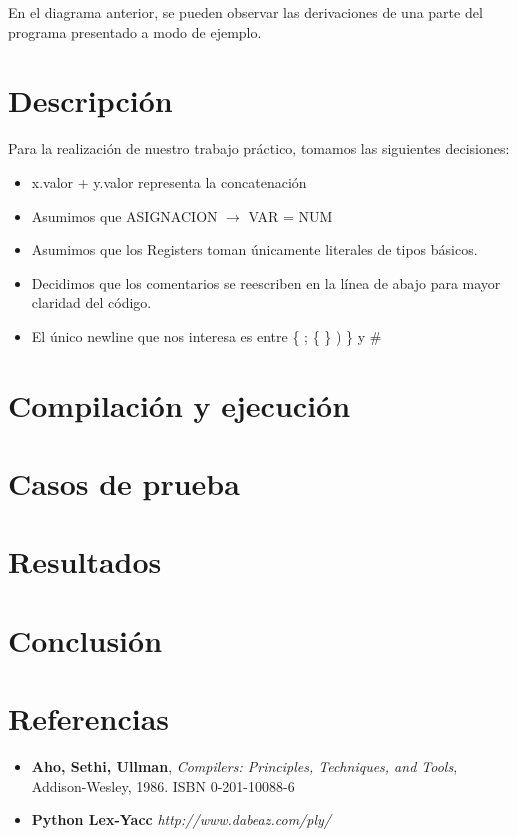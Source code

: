 \documentclass[10pt,a4paper]{article}
\begin{document}
En el diagrama anterior, se pueden observar las derivaciones de una parte del programa presentado a modo de ejemplo.

\section{Descripción}

Para la realización de nuestro trabajo práctico, tomamos las siguientes decisiones:
\begin{itemize}

\item x.valor + y.valor representa la concatenación

\item Asumimos que ASIGNACION $\rightarrow$ VAR = NUM 

\item Asumimos que los Registers toman únicamente literales de tipos básicos.

\item Decidimos que los comentarios se reescriben en la línea de abajo para mayor claridad del código.

\item El único newline que nos interesa es entre \{ ; \{ \} ) \} y \#
\end{itemize}


\section{Compilación y ejecución}

\section{Casos de prueba}

\section{Resultados}

\section{Conclusión}

\section{Referencias}
\begin{itemize}
\item \textbf{Aho, Sethi, Ullman}, \textit{Compilers: Principles, Techniques, and Tools}, Addison-Wesley, 1986. ISBN 0-201-10088-6

\item \textbf{Python Lex-Yacc} \textit{http://www.dabeaz.com/ply/}
\end{itemize}
\end{document}
